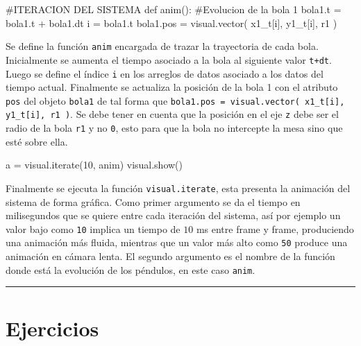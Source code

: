 \begin{listing}[style=python, numbers = none]
#ITERACION DEL SISTEMA
def anim(): 
    #Evolucion de la bola 1
    bola1.t = bola1.t + bola1.dt
    i = bola1.t
    bola1.pos = visual.vector( x1_t[i], y1_t[i], r1 )
\end{listing}
Se define la función \texttt{anim} encargada de trazar la trayectoria de 
cada bola. Inicialmente se aumenta el tiempo asociado a la bola al 
siguiente valor \texttt{t+dt}. Luego se define el índice \texttt{i} en los
arreglos de datos asociado a los datos del tiempo actual. Finalmente se 
actualiza la posición de la bola 1 con el atributo \texttt{pos} del objeto
\texttt{bola1} de tal forma que \texttt{bola1.pos = visual.vector( 
x1\_t[i], y1\_t[i], r1 )}. Se debe tener en cuenta que la posición en el 
eje \texttt{z} debe ser el radio de la bola \texttt{r1} y no \texttt{0},
esto para que la bola no intercepte la mesa sino que esté sobre ella.


\begin{listing}[style=python, numbers = none]
a = visual.iterate(10, anim)
visual.show()
\end{listing}
Finalmente se ejecuta la función \texttt{visual.iterate}, esta presenta
la animación del sistema de forma gráfica. Como primer argumento se da el 
tiempo en milisegundos que se quiere entre cada iteración del sistema, así
por ejemplo un valor bajo como \texttt{10} implica un tiempo de $10$ ms 
entre frame y frame, produciendo una animación más fluida, mientras que un
valor más alto como \texttt{50} produce una animación en cámara lenta. El 
segundo argumento es el nombre de la función donde está la evolución de los
péndulos, en este caso \texttt{anim}.


\rule{14cm}{0.5mm}



\section{Ejercicios}
\label{sec:ejercicios}

